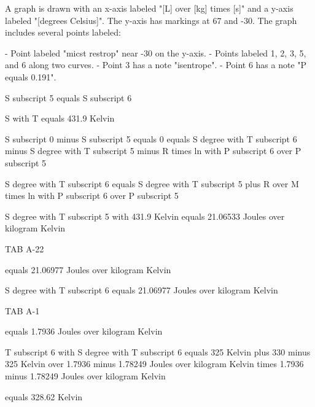 A graph is drawn with an x-axis labeled "[L] over [kg] times [s]" and a y-axis labeled "[degrees Celsius]". The y-axis has markings at 67 and -30. The graph includes several points labeled:

- Point labeled "micst restrop" near -30 on the y-axis.
- Points labeled 1, 2, 3, 5, and 6 along two curves.
- Point 3 has a note "isentrope".
- Point 6 has a note "P equals 0.191".

S subscript 5 equals S subscript 6

S with T equals 431.9 Kelvin

S subscript 0 minus S subscript 5 equals 0 equals S degree with T subscript 6 minus S degree with T subscript 5 minus R times ln with P subscript 6 over P subscript 5

S degree with T subscript 6 equals S degree with T subscript 5 plus R over M times ln with P subscript 6 over P subscript 5

S degree with T subscript 5 with 431.9 Kelvin equals 21.06533 Joules over kilogram Kelvin

TAB A-22

equals 21.06977 Joules over kilogram Kelvin

S degree with T subscript 6 equals 21.06977 Joules over kilogram Kelvin

TAB A-1

equals 1.7936 Joules over kilogram Kelvin

T subscript 6 with S degree with T subscript 6 equals 325 Kelvin plus 330 minus 325 Kelvin over 1.7936 minus 1.78249 Joules over kilogram Kelvin times 1.7936 minus 1.78249 Joules over kilogram Kelvin

equals 328.62 Kelvin